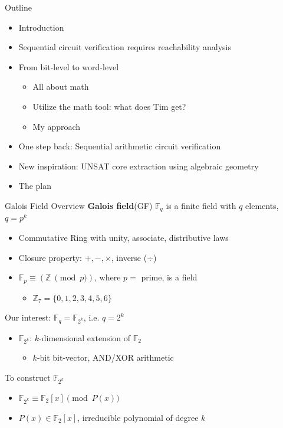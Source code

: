 \documentclass[xcolor=dvipsnames]{beamer}
\newcommand{\bi}{\begin{itemize}}
\newcommand{\ei}{\end{itemize}}
\begin{document}
\begin{frame}{\large{Outline}}
\bi
\item Introduction
\item Sequential circuit verification requires reachability analysis
\item From bit-level to word-level
	\bi
	\item \alert{All about math}
	\item Utilize the math tool: what does Tim get?
	\item My approach
	\ei
\item One step back: Sequential arithmetic circuit verification
\item New inspiration: UNSAT core extraction using algebraic geometry
\item The plan
\ei
\end{frame}
\begin{frame}{\large {Galois Field Overview}}
\textbf {Galois field}(GF) $\mathbb{F}_q$ is a finite field with $q$
elements, $q = p^k$
\begin{itemize}
\item Commutative Ring with unity, associate, distributive laws
\item Closure property: $+,-,\times$, inverse ($\div$)
\end{itemize}

\begin{itemize}
\item $\mathbb{F}_p \equiv (\mathbb{Z} ~\pmod{ p })$, where $p = $ prime, is a field
\begin{itemize}
\item $\mathbb{Z}_7=\{0,1,2,3,4,5,6\}$
\end{itemize}


\end{itemize}

Our interest: $\mathbb{F}_{q} = \mathbb{F}_{2^k}$, i.e. $q = 2^k$
\begin{itemize}
\item  $\mathbb{F}_{2^k}$: $k$-dimensional extension of  $\mathbb{F}_{2}$
	\begin{itemize}
	\item $k$-bit bit-vector, AND/XOR arithmetic
	\end{itemize}
\end{itemize}

To construct $\mathbb{F}_{2^k}$
\begin{itemize}
\item $\mathbb{F}_{2^k} \equiv \mathbb{F}_{2}[x] \pmod {P(x)}$
\item $P(x) \in \mathbb{F}_{2}[x]$, irreducible polynomial of degree $k$
\end{itemize}

\end{frame}
\end{document}
